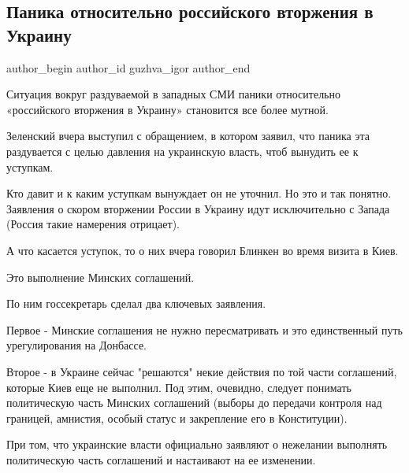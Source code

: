  
 
 
 
 
 
\subsection{Паника относительно российского вторжения в Украину}
\label{sec:20_01_2022.fb.guzhva_igor.1.panika_vtorzhenie}
 
\ifcmt
 author_begin
   author_id guzhva_igor
 author_end
\fi

Ситуация вокруг раздуваемой в западных СМИ паники относительно «российского
вторжения в Украину» становится все более мутной.

Зеленский вчера выступил с обращением, в котором заявил, что паника эта
раздувается с целью давления на украинскую власть, чтоб вынудить ее к уступкам.

Кто давит и к каким уступкам вынуждает он не уточнил. Но это и так понятно.
Заявления о скором вторжении России в Украину идут исключительно с Запада
(Россия такие намерения отрицает). 

А что касается уступок, то о них вчера говорил Блинкен во время визита в Киев.

Это выполнение Минских соглашений.

По ним госсекретарь сделал два ключевых заявления.

Первое - Минские соглашения не нужно пересматривать и это единственный путь
урегулирования на Донбассе.

Второе - в Украине сейчас "решаются" некие действия по той части соглашений,
которые Киев еще не выполнил. Под этим, очевидно, следует понимать политическую
часть Минских соглашений (выборы до передачи контроля над границей, амнистия,
особый статус и закрепление его в Конституции). 

При том, что украинские власти официально заявляют о нежелании выполнять
политическую часть соглашений и настаивают на ее изменении.

